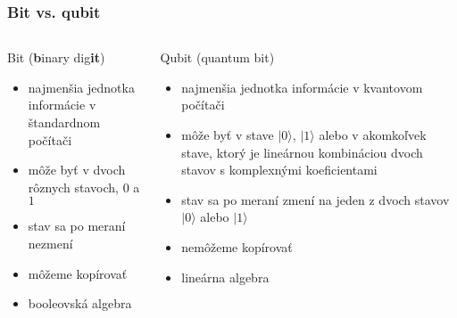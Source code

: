 \documentclass{beamer}
\newcommand{\ket}[1]{\lvert#1\rangle} %
\begin{document}
\begin{frame}
	\frametitle{Bit vs. qubit}
	\begin{columns}[t]
		\begin{column}{.5\textwidth}
			\centering
			Bit (\textbf{b}inary dig\textbf{it})  
			\vspace{0.4cm} 
			\begin{itemize}
				\item najmenšia jednotka informácie v štandardnom počítači
				\item môže byť v dvoch rôznych stavoch, $0$ a $1$
				\item stav sa po meraní nezmení
				\item môžeme kopírovať
				\item booleovská algebra
				      				      
			\end{itemize}
		\end{column}
						      
		\begin{column}{.5\textwidth}
			\centering
			Qubit (quantum bit)
			\vspace{0.4cm}
			\begin{itemize}
				\item najmenšia jednotka informácie v kvantovom počítači
				\item môže byť v stave $\ket{0}$, $\ket{1}$ alebo v akomkoľvek stave, ktorý je lineárnou kombináciou dvoch stavov s komplexnými koeficientami
				\item stav sa po meraní zmení na jeden z dvoch stavov $\ket{0}$ alebo $\ket{1}$
				\item nemôžeme kopírovať
				\item lineárna algebra 
				      
			\end{itemize}		
		\end{column}
	\end{columns}
\end{frame}
\end{document}

